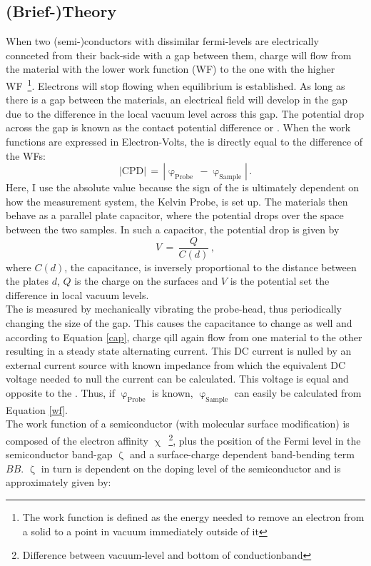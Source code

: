 \documentclass[a4paper,10pt]{article}
\newcommand{\wfp}{\ensuremath{\upvarphi _{\text{Probe}}}}
\newcommand{\wfs}{\ensuremath{\upvarphi _{\text{Sample}}}}
\newcommand{\cpd}{\text{CPD}}
\newcommand{\wf}{WF}
\begin{document}
\subsection{(Brief-)Theory}
When two (semi-)conductors with dissimilar fermi-levels are electrically connceted from their back-side with a gap between them, charge will flow from the material with the lower work function (\wf{}) to the one with the higher \wf{}~\footnote{The work function is defined as the energy needed to remove an electron from a solid to a point in vacuum immediately outside of it}. Electrons will stop flowing when equilibrium is established. As long as there is a gap between the materials, an electrical field will develop in the gap due to the difference in the local vacuum level across this gap. 
The potential drop across the gap is known as the contact potential difference or \cpd{}. When the work functions are expressed in Electron-Volts, the \cpd{} is directly equal to the difference of the \wf{}s:
\begin{equation}
\label{wf}
	|{\cpd}| \, = \, | \wfp \, - \wfs | \, .
\end{equation}
Here, I use the absolute value because the sign of the \cpd{} is ultimately dependent on how the measurement system, the Kelvin Probe, is set up. The materials then behave as a parallel plate capacitor, where the potential drops over the space between the two samples. In such a capacitor, the potential drop is given by
\begin{equation}
\label{cap}
	V \, = \,  \frac{Q}{C(d)} \, , 
\end{equation}
where $C(d)$, the capacitance, is inversely proportional to the distance between the plates $d$, $Q$ is the charge on the surfaces and $V$ is the potential set the difference in local vacuum levels.\\
The \cpd{} is measured by mechanically vibrating the probe-head, thus periodically changing the size of the gap. This causes the capacitance to change as well and according to Equation \eqref{cap}, charge qill again flow from one material to the other resulting in a steady state alternating current. This DC current is nulled by an external current source with known impedance from which the equivalent DC voltage needed to null the current can be calculated. This voltage is equal and opposite to the \cpd{}. Thus, if \wfp{} is known, \wfs{} can easily be calculated from Equation \eqref{wf}.\\
The work function of a semiconductor (with molecular surface modification) is composed of the electron affinity $\upchi$~\footnote{Difference between vacuum-level and bottom of conductionband}, plus the position of the Fermi level in the semiconductor band-gap $\upzeta$ and a surface-charge dependent band-bending term $BB$. $\upzeta$ in turn is dependent on the doping level of the semiconductor and is approximately given by:\\
\end{document}
